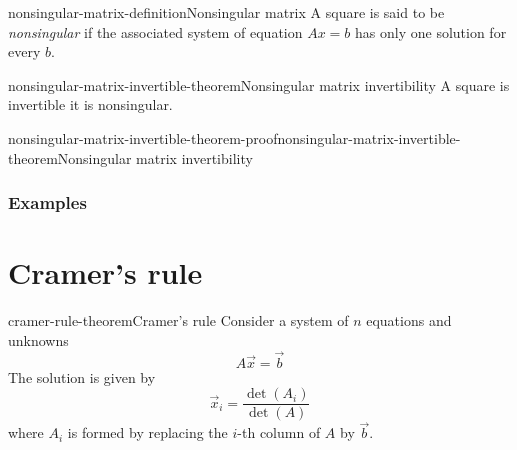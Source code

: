 \documentclass[preview]{standalone}
\begin{document}

\begin{snippetdefinition}{nonsingular-matrix-definition}{Nonsingular matrix}
    A square \matrix is said to be \emph{nonsingular} if
    the associated system of equation \(Ax = b\) has only one solution for every \(b\).
\end{snippetdefinition}

\begin{snippettheorem}{nonsingular-matrix-invertible-theorem}{Nonsingular matrix invertibility}
    A square \matrix is invertible \ifandonlyif it is nonsingular.
\end{snippettheorem}

\begin{snippetproof}{nonsingular-matrix-invertible-theorem-proof}{nonsingular-matrix-invertible-theorem}{Nonsingular matrix invertibility}
\end{snippetproof}

\subsubsection{Examples}


\section{Cramer's rule}

\begin{snippettheorem}{cramer-rule-theorem}{Cramer's rule}
    Consider a system of \(n\) equations and unknowns
    \[
        A\vec{x}=\vec{b}
    \]
    The solution is given by
    \[
        \vec{x}_i = \frac{\det(A_i)}{\det(A)}
    \]
    where \(A_i\) is formed by replacing the \(i\)-th column
    of \(A\) by \(\vec{b}\).
\end{snippettheorem}
\end{document}
